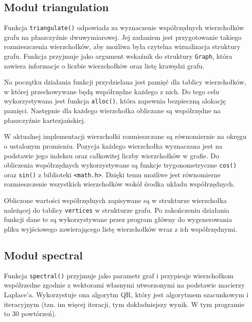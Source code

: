\documentclass[11pt,a4paper]{article}
\begin{document}
\subsection{Moduł triangulation}

Funkcja \verb|triangulate()| odpowiada za wyznaczenie współrzędnych wierzchołków grafu na płaszczyźnie dwuwymiarowej. Jej zadaniem jest przygotowanie takiego rozmieszczenia wierzchołków, aby możliwa była czytelna wizualizacja struktury grafu. Funkcja przyjmuje jako argument wskaźnik do struktury \verb|Graph|, która zawiera informacje o liczbie wierzchołków oraz listę krawędzi grafu.

Na początku działania funkcji przydzielana jest pamięć dla tablicy wierzchołków, w której przechowywane będą współrzędne każdego z nich. Do tego celu wykorzystywana jest funkcja \verb|alloc()|, która zapewnia bezpieczną alokację pamięci. Następnie dla każdego wierzchołka obliczane są współrzędne na płaszczyźnie kartezjańskiej.

W aktualnej implementacji wierzchołki rozmieszczane są równomiernie na okręgu o ustalonym promieniu. Pozycja każdego wierzchołka wyznaczana jest na podstawie jego indeksu oraz całkowitej liczby wierzchołków w grafie. Do obliczenia współrzędnych wykorzystywane są funkcje trygonometryczne \verb|cos()| oraz \verb|sin()| z biblioteki \verb|<math.h>|. Dzięki temu możliwe jest równomierne rozmieszczenie wszystkich wierzchołków wokół środka układu współrzędnych.

Obliczone wartości współrzędnych zapisywane są w strukturze wierzchołka należącej do tablicy \verb|vertices| w strukturze grafu. Po zakończeniu działania funkcji dane te są wykorzystywane przez program główny do wygenerowania pliku wyjściowego zawierającego listę wierzchołków wraz z ich współrzędnymi.

\subsection{Moduł spectral}


Funkcja \verb|spectral()| przyjmuje jako parametr graf i przypisuje wierzchołkom współrzedne zgodnie z wektorami własnymi utworzonymi na podstawie macierzy Laplace'a. Wykorzystuje ona algorytm QR, który jest algorytmem szacunkowym i iteracyjnym (tzn. im więcej iteracji, tym dokładniejszy wynik. W tym programie to 30 powtórzeń).
\end{document}

